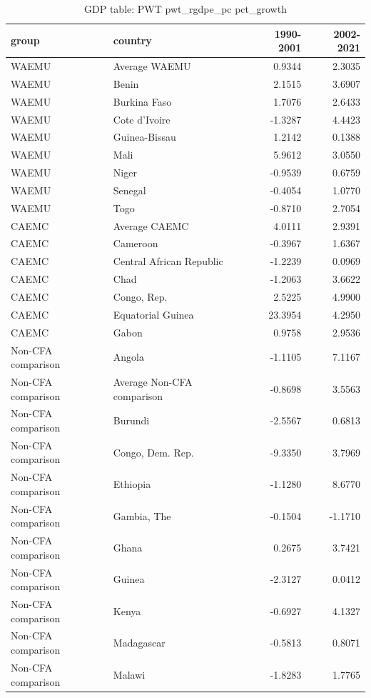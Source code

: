 \begin{table}

\caption{GDP table: PWT pwt_rgdpe_pc pct_growth}
\centering
\begin{tabular}[t]{llrr}
\toprule
group & country & 1990-2001 & 2002-2021\\
\midrule
WAEMU & Average WAEMU & 0.9344 & 2.3035\\
WAEMU & Benin & 2.1515 & 3.6907\\
WAEMU & Burkina Faso & 1.7076 & 2.6433\\
WAEMU & Cote d'Ivoire & -1.3287 & 4.4423\\
WAEMU & Guinea-Bissau & 1.2142 & 0.1388\\
\addlinespace
WAEMU & Mali & 5.9612 & 3.0550\\
WAEMU & Niger & -0.9539 & 0.6759\\
WAEMU & Senegal & -0.4054 & 1.0770\\
WAEMU & Togo & -0.8710 & 2.7054\\
CAEMC & Average CAEMC & 4.0111 & 2.9391\\
\addlinespace
CAEMC & Cameroon & -0.3967 & 1.6367\\
CAEMC & Central African Republic & -1.2239 & 0.0969\\
CAEMC & Chad & -1.2063 & 3.6622\\
CAEMC & Congo, Rep. & 2.5225 & 4.9900\\
CAEMC & Equatorial Guinea & 23.3954 & 4.2950\\
\addlinespace
CAEMC & Gabon & 0.9758 & 2.9536\\
Non-CFA comparison & Angola & -1.1105 & 7.1167\\
Non-CFA comparison & Average Non-CFA comparison & -0.8698 & 3.5563\\
Non-CFA comparison & Burundi & -2.5567 & 0.6813\\
Non-CFA comparison & Congo, Dem. Rep. & -9.3350 & 3.7969\\
\addlinespace
Non-CFA comparison & Ethiopia & -1.1280 & 8.6770\\
Non-CFA comparison & Gambia, The & -0.1504 & -1.1710\\
Non-CFA comparison & Ghana & 0.2675 & 3.7421\\
Non-CFA comparison & Guinea & -2.3127 & 0.0412\\
Non-CFA comparison & Kenya & -0.6927 & 4.1327\\
\addlinespace
Non-CFA comparison & Madagascar & -0.5813 & 0.8071\\
Non-CFA comparison & Malawi & -1.8283 & 1.7765\\

\end{tabular}
\end{table}
